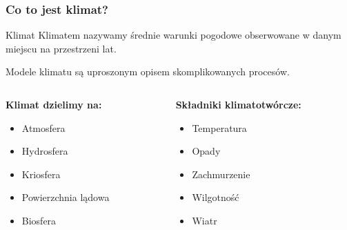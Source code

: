 \documentclass{beamer}
\begin{document}


\begin{frame}
\frametitle{Co to jest klimat?}
\theoremstyle{definition}
\begin{block}{Klimat}
	Klimatem nazywamy średnie warunki pogodowe obserwowane w danym miejscu na przestrzeni lat. 
\end{block}
Modele klimatu są uproszonym opisem skomplikowanych procesów.

\begin{columns}
\begin{column}{0.5\textwidth}

	\textbf{Klimat dzielimy na:}
	\begin{itemize}
		\item Atmosfera %
		\item Hydrosfera %
		\item Kriosfera %
		\item Powierzchnia lądowa
		\item Biosfera %
	\end{itemize}
\end{column}
\begin{column}{0.5\textwidth}

	\textbf{Składniki klimatotwórcze:}
	\begin{itemize}
		\item Temperatura
		\item Opady
		\item Zachmurzenie
		\item Wilgotność
		\item Wiatr
	\end{itemize}
\end{column}
\end{columns}
\end{frame}
\end{document}
